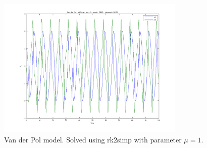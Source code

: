 \begin{figure}[h!]
	\centering
	\includegraphics[width=0.8\textwidth]{img/exc1_2_1}
	\caption{Van der Pol model. Solved using rk2simp with parameter $\mu = 1$.}
	\label{fig:exc1_2_1}
\end{figure}